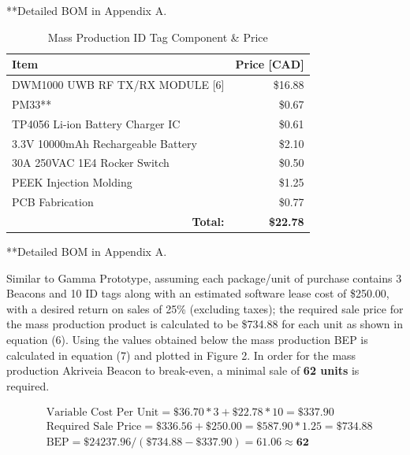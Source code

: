 \begin{flushright}
	**Detailed BOM in Appendix A.
\end{flushright}

\pagebreak
\bgroup
\def\arraystretch{1.5}
\begin{table}[H]
\centering
\begin{tabular}{ | m{12.5cm} | m{3cm} |}
\hline
\textbf{Item} & \textbf{Price [CAD]}\\
\hline
DWM1000 UWB RF TX/RX MODULE {[6]} & \multicolumn{1}{r|}{\$16.88} \\
\hline
PM33** & \multicolumn{1}{r|}{\$0.67} \\
\hline
TP4056 Li-ion Battery Charger IC & \multicolumn{1}{r|}{\$0.61} \\
\hline
3.3V 10000mAh Rechargeable Battery  & \multicolumn{1}{r|}{\$2.10} \\
\hline
30A 250VAC 1E4 Rocker Switch  & \multicolumn{1}{r|}{\$0.50} \\
\hline
PEEK Injection Molding & \multicolumn{1}{r|}{\$1.25} \\
\hline
PCB Fabrication & \multicolumn{1}{r|}{\$0.77} \\
\hline
\multicolumn{1}{|r|}{\textbf{Total:}} & \multicolumn{1}{r|}{\textbf{\$22.78}} \\
\hline

\end{tabular}
\caption{Mass Production ID Tag Component \& Price}
\end{table}

\begin{flushright}
	**Detailed BOM in Appendix A.
\end{flushright}

\bigskip
Similar to Gamma Prototype, assuming each package/unit of purchase contains 3 Beacons and 10 ID tags along with an estimated software lease cost of \$250.00, with a desired return on sales of 25\% (excluding taxes); the required sale price for the mass production product is calculated to be \$734.88 for each unit as shown in equation (6). Using the values obtained below the mass production BEP is calculated in equation (7) and plotted in Figure 2. In order for the mass production Akriveia Beacon to break-even, a minimal sale of \textbf{62 units} is required.

\begin{align} 
	&\text{Variable Cost Per Unit} = \$36.70 * 3 + \$22.78 * 10 = \$337.90	\\
	&\text{Required Sale Price} = \$336.56 + \$250.00 = \$587.90 * 1.25 = \$734.88 \\
	&\text{BEP} = \$24237.96 / (\$734.88 - \$337.90) = 61.06 \approx \textbf{62}	
\end{align}

